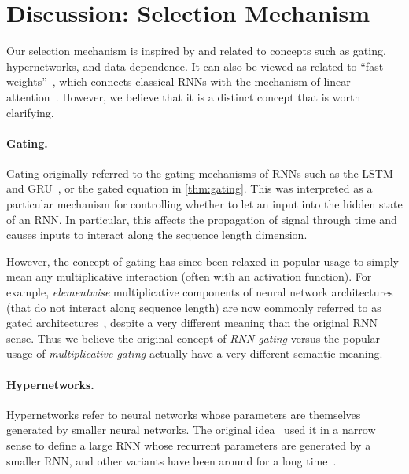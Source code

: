 \section{Discussion: Selection Mechanism}
\label{sec:discussion:selection}

Our selection mechanism is inspired by and related to concepts such as gating, hypernetworks, and data-dependence.
It can also be viewed as related to ``fast weights''~\citep{schmidhuber1992learning,ba2016using}, which connects classical RNNs with the mechanism of linear attention~\citep{schlag2021linear}.
However, we believe that it is a distinct concept that is worth clarifying.

\paragraph{Gating.}
Gating originally referred to the gating mechanisms of RNNs such as the LSTM~\citep{lstm} and GRU~\citep{chung2014empirical},
or the gated equation \iftoggle{arxiv}{\eqref{eq:gates}}{} in \cref{thm:gating}.
This was interpreted as a particular mechanism for controlling whether to let an input into the hidden state of an RNN.
In particular, this affects the propagation of signal through time and causes inputs to interact along the sequence length dimension.

However, the concept of gating has since been relaxed in popular usage to simply mean any multiplicative interaction (often with an activation function).
For example, \emph{elementwise} multiplicative components of neural network architectures (that do not interact along sequence length) are now commonly referred to as gated architectures~\citep{hua2022transformer,mehta2023long}, despite a very different meaning than the original RNN sense.
Thus we believe the original concept of \emph{RNN gating} versus the popular usage of \emph{multiplicative gating} actually have a very different semantic meaning.

\paragraph{Hypernetworks.}
Hypernetworks refer to neural networks whose parameters are themselves generated by smaller neural networks.
The original idea~\citep{ha2017hypernetworks} used it in a narrow sense to define a large RNN whose recurrent parameters are generated by a smaller RNN,
and other variants have been around for a long time~\citep{schmidhuber1992learning}.

